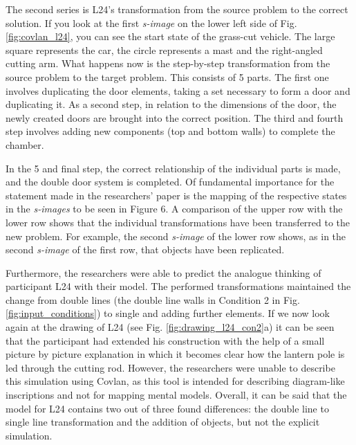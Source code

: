 \documentclass[12pt]{article}
\begin{document}
The second series is L24's transformation from the source problem to the correct solution. If you look at the first \textit{s-image} on the lower left side of Fig. \ref{fig:covlan_l24}, you can see the start state of the grass-cut vehicle. The large square represents the car, the circle represents a mast and the right-angled cutting arm. What happens now is the step-by-step transformation from the source problem to the target problem. This consists of 5 parts. The first one involves duplicating the door elements, taking a set necessary to form a door and duplicating it. As a second step, in relation to the dimensions of the door, the newly created doors are brought into the correct position. The third and fourth step involves adding new components (top and bottom walls) to complete the chamber. 

In the 5 and final step, the correct relationship of the individual parts is made, and the double door system is completed. Of fundamental importance for the statement made in the researchers' paper is the mapping of the respective states in the \textit{s-images} to be seen in Figure 6. A comparison of the upper row with the lower row shows that the individual transformations have been transferred to the new problem. For example, the second \textit{s-image} of the lower row shows, as in the second \textit{s-image} of the first row, that objects have been replicated.

Furthermore, the researchers were able to predict the analogue thinking of participant L24 with their model. The performed transformations maintained the change from double lines (the double line walls in Condition 2 in Fig. \ref{fig:input_conditions}) to single and adding further elements.  If we now look again at the drawing of L24 (see Fig. \ref{fig:drawing_l24_con2}a) it can be seen that the participant had extended his construction with the help of a small picture by picture explanation in which it becomes clear how the lantern pole is led through the cutting rod.  However, the researchers were unable to describe this simulation using Covlan, as this tool is intended for describing diagram-like inscriptions and not for mapping mental models. Overall, it can be said that the model for L24 contains two out of three found differences: the double line to single line transformation and the addition of objects, but not the explicit simulation.
\end{document}
